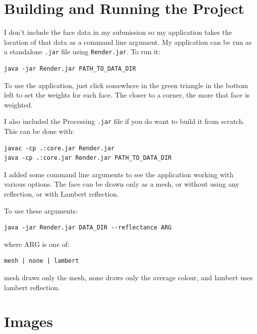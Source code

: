\documentclass{article}
\begin{document}
\section{Building and Running the Project}
I don't include the face data in my submission 
so my application takes the location of that data 
as a command line argument. 
My application can be run as a standalone \verb+.jar+
file using \verb+Render.jar+.
To run it:
\begin{verbatim}
java -jar Render.jar PATH_TO_DATA_DIR
\end{verbatim}

To use the application, just click somewhere in the 
green triangle in the bottom left to set the 
weights for each face. The closer to a 
corner, the more that face is weighted. 

I also included the Processing \verb-.jar- file 
if you do want to build it from scratch. This 
can be done with:
\begin{verbatim}
javac -cp .:core.jar Render.jar
java -cp .:core.jar Render.jar PATH_TO_DATA_DIR
\end{verbatim}
I added some command line arguments to see the application working 
with various options. The face can be drawn only as a mesh, 
or without using any reflection, or with Lambert reflection. 

To use these arguments:
\begin{verbatim}
java -jar Render.jar DATA_DIR --reflectance ARG
\end{verbatim}
where ARG is one of:
\begin{verbatim}
mesh | none | lambert
\end{verbatim}
mesh draws only the mesh, none draws only the 
average colour, and lambert uses lambert reflection. 

\section{Images}
\end{document}
